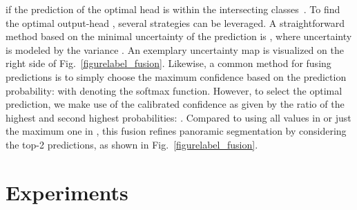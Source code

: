 \documentclass[final]{cvpr}
\begin{document}
if the prediction of the optimal head  is within the intersecting classes~.
To find the optimal output-head , several strategies can be leveraged.
A straightforward method based on the minimal uncertainty of the prediction is , where uncertainty is modeled by the variance .
An exemplary uncertainty map is visualized on the right side of Fig.~\ref{figurelabel_fusion}.
Likewise, a common method for fusing predictions is to simply choose the maximum confidence based on the prediction probability:  with   denoting the softmax function.
However, to select the optimal prediction, we make use of the calibrated confidence as given by the ratio of the highest and second highest probabilities: .
Compared to using all values in  or just the maximum one in , this fusion refines panoramic segmentation by considering the top-2 predictions, as shown in Fig.~\ref{figurelabel_fusion}.

\section{Experiments}
\end{document}
